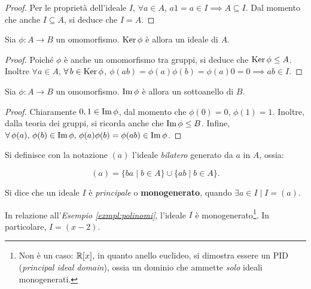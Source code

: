 \documentclass[11pt]{scrbook}
\begin{document}
\begin{proof}
    Per le proprietà dell'ideale $I$, $\forall a \in A$, $a1 = a \in I \implies
        A \subseteq I$. Dal momento che anche $I \subseteq A$, si deduce che $I = A$.
\end{proof}

\begin{proposition}
    Sia $\phi : A \to B$ un omomorfismo. $\operatorname{Ker} \phi$ è allora un ideale di $A$.
\end{proposition}

\begin{proof}
    Poiché $\phi$ è anche un omomorfismo tra gruppi, si deduce che $\operatorname{Ker} \phi \leq A$.
    Inoltre $\forall a \in A$, $\forall b \in \Ker \phi$, $\phi(ab)=\phi(a)\phi(b)=\phi(a)0=0 \implies ab \in I$.
\end{proof}

\begin{proposition}
    Sia $\phi : A \to B$ un omomorfismo. $\operatorname{Im} \phi$ è allora un sottoanello di $B$.
\end{proposition}

\begin{proof}
    Chiaramente $0, 1 \in \operatorname{Im} \phi$, dal momento che $\phi(0) = 0,\, \phi(1)=1$. Inoltre, dalla teoria dei gruppi, si ricorda anche che $\operatorname{Im} \phi \leq B$.
    Infine, $\forall \phi(a),\, \phi(b) \in \Imm \phi, \, \phi(a)\phi(b) = \phi(ab) \in \Imm \phi$.
\end{proof}

\begin{definition}
    Si definisce con la notazione $(a)$ l'ideale \textit{bilatero} generato da $a$ in $A$, ossia:

    \[(a)=\{ba \mid b \in A\} \cup \{ab \mid b \in A\}.\]
\end{definition}

\begin{definition}
    Si dice che un ideale $I$ è \textit{principale} o \textbf{monogenerato}, quando $\exists a \in I \mid I = (a)$.
\end{definition}

\begin{example}
    In relazione all'\textit{Esempio \ref{exmpl:polinomi}}, l'ideale $I$ è
    monogenerato\footnote{Non è un caso: $\mathbb R[x]$, in quanto anello euclideo, si dimostra essere un PID (\textit{principal ideal domain}), ossia un dominio che ammette \textit{solo} ideali monogenerati.}. In particolare, $I=(x-2)$.
\end{example}
\end{document}
